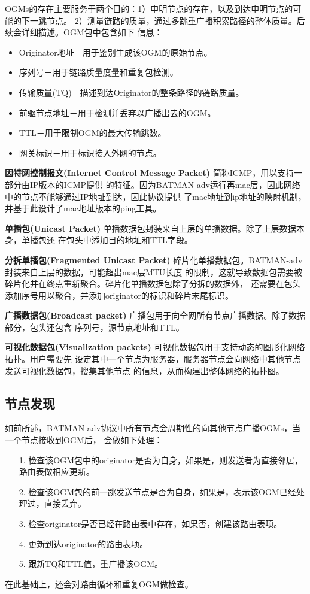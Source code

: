 OGMs的存在主要服务于两个目的：1）申明节点的存在，以及到达申明节点的可能的下一跳节点。
2）测量链路的质量，通过多跳重广播积累路径的整体质量。后续会详细描述。OGM包中包含如下
信息：
\begin{itemize}
\item Originator地址－用于鉴别生成该OGM的原始节点。
\item 序列号－用于链路质量度量和重复包检测。
\item 传输质量(TQ)－描述到达Originator的整条路径的链路质量。
\item 前驱节点地址－用于检测并丢弃以广播出去的OGM。
\item TTL－用于限制OGM的最大传输跳数。
\item 网关标识－用于标识接入外网的节点。
\end{itemize}

\textbf{因特网控制报文(Internet Control Message Packet)} 简称ICMP，用以支持一部分由IP版本的ICMP提供
的特征。因为BATMAN-adv运行再mac层，因此网络中的节点不能够通过IP地址到达，因此协议提供
了mac地址到ip地址的映射机制，并基于此设计了mac地址版本的ping工具。

\textbf{单播包(Unicast Packet)} 单播数据包封装来自上层的单播数据。除了上层数据本身，单播包还
在包头中添加目的地址和TTL字段。

\textbf{分拆单播包(Fragmented Unicast Packet)} 碎片化单播数据包。BATMAN-adv封装来自上层的数据，可能超出mac层MTU长度
的限制，这就导致数据包需要被碎片化并在终点重新聚合。碎片化单播数据包除了分拆的数据外，
还需要在包头添加序号用以聚合，并添加originator的标识和碎片末尾标识。

\textbf{广播数据包(Broadcast packet)} 广播包用于向全网所有节点广播数据。除了数据部分，包头还包含
序列号，源节点地址和TTL。

\textbf{可视化数据包(Visualization packets)} 可视化数据包用于支持动态的图形化网络拓扑。用户需要先
设定其中一个节点为服务器，服务器节点会向网络中其他节点发送可视化数据包，搜集其他节点
的信息，从而构建出整体网络的拓扑图。

\subsection{节点发现}
如前所述，BATMAN-adv协议中所有节点会周期性的向其他节点广播OGMs，当一个节点接收到OGM后，
会做如下处理：
\begin{itemize}
\item[1.] 检查该OGM包中的originator是否为自身，如果是，则发送者为直接邻居，路由表做相应更新。
\item[2.] 检查该OGM包的前一跳发送节点是否为自身，如果是，表示该OGM已经处理过，直接丢弃。
\item[3.] 检查originator是否已经在路由表中存在，如果否，创建该路由表项。
\item[4.] 更新到达originator的路由表项。
\item[5.] 跟新TQ和TTL值，重广播该OGM。
\end{itemize}
在此基础上，还会对路由循环和重复OGM做检查。


